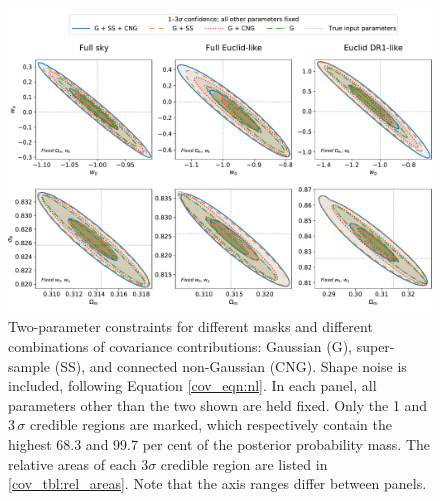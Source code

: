 \begin{figure}
\includegraphics[width=\textwidth]{2d_constraints}
\caption{Two-parameter constraints for different masks and different combinations of covariance contributions: Gaussian (G), super-sample (SS), and connected non-Gaussian (CNG). Shape noise is included, following Equation \eqref{cov_eqn:nl}. In each panel, all parameters other than the two shown are held fixed. Only the 1 and 3\,$\sigma$ credible regions are marked, which respectively contain the highest 68.3 and 99.7 per cent of the posterior probability mass. The relative areas of each $3\sigma$ credible region are listed in \autoref{cov_tbl:rel_areas}. Note that the axis ranges differ between panels.}
\label{cov_fig:2d_constraints}
\end{figure}

